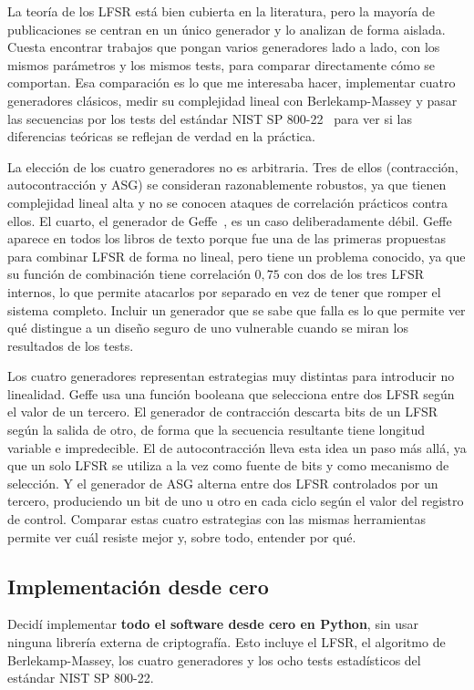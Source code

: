 La teoría de los LFSR está bien cubierta en la literatura, pero la mayoría de publicaciones se centran en un único generador y lo analizan de forma aislada.
Cuesta encontrar trabajos que pongan varios generadores lado a lado, con los mismos parámetros y los mismos tests,
para comparar directamente cómo se comportan. Esa comparación es lo que me interesaba hacer,
implementar cuatro generadores clásicos, medir su complejidad lineal con Berlekamp-Massey
y pasar las secuencias por los tests del estándar NIST SP 800-22~\cite{nist2010}
para ver si las diferencias teóricas se reflejan de verdad en la práctica.

La elección de los cuatro generadores no es arbitraria.
Tres de ellos (contracción, autocontracción y ASG) se consideran razonablemente robustos,
ya que tienen complejidad lineal alta y no se conocen ataques de correlación prácticos contra ellos.
El cuarto, el generador de Geffe~\cite{geffe1973}, es un caso deliberadamente débil.
Geffe aparece en todos los libros de texto porque fue una de las primeras propuestas para combinar LFSR de forma no lineal,
pero tiene un problema conocido, ya que su función de combinación tiene correlación $0{,}75$ con dos de los tres LFSR internos,
lo que permite atacarlos por separado en vez de tener que romper el sistema completo.
Incluir un generador que se sabe que falla es lo que permite ver qué distingue a un diseño seguro de uno vulnerable
cuando se miran los resultados de los tests.

Los cuatro generadores representan estrategias muy distintas para introducir no linealidad.
Geffe usa una función booleana que selecciona entre dos LFSR según el valor de un tercero.
El generador de contracción descarta bits de un LFSR según la salida de otro,
de forma que la secuencia resultante tiene longitud variable e impredecible.
El de autocontracción lleva esta idea un paso más allá, ya que un solo LFSR se utiliza a la vez como fuente de bits y como mecanismo de selección.
Y el generador de ASG alterna entre dos LFSR controlados por un tercero,
produciendo un bit de uno u otro en cada ciclo según el valor del registro de control.
Comparar estas cuatro estrategias con las mismas herramientas permite ver cuál resiste mejor y, sobre todo, entender por qué.

\subsection*{Implementación desde cero}

Decidí implementar \textbf{todo el software desde cero en Python}, sin usar ninguna librería externa de criptografía.
Esto incluye el LFSR, el algoritmo de Berlekamp-Massey, los cuatro generadores y los ocho tests estadísticos del estándar NIST SP 800-22.

